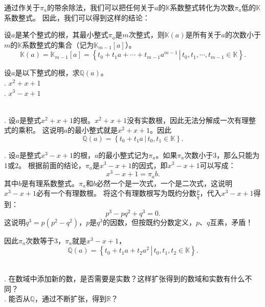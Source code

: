 \documentclass[12pt,UTF8]{ctexbook}
\begin{document}
通过作关于$\pi_a$的带余除法，我们可以把任何关于$a$的$\mathbb{K}$系数整式转化为次数$\pi_a$低的$\mathbb{K}$系数整式。
因此，我们可以得到这样的结论：

\begin{tm}
    设$a$是某个整式的根，其最小整式$\pi_a$是$m$次整式，则$\mathbb{K}(a)$是所有关于$a$的次数小于$m$的$\mathbb{K}$系数整式的集合（记为$\mathbb{K}_{m-1}[a]$）。
    $$\mathbb{K}(a) = \mathbb{K}_{m-1}[a] = \left\{\left.t_0 + t_1 a + \cdots + t_{m-1} a^{m-1} \, \right| \, t_0, t_1, \cdots , t_{m-1} \in \mathbb{K} \right\}.$$
\end{tm}

\begin{et}
    设$a$是以下整式的根，求$\mathbb{Q}(a)$。\\
    . $x^2 + x + 1 $\\
    . $x^3 - x + 1 $
\end{et}

\begin{so}
    \mbox{} \\
    . 设$a$是整式$x^2 + x + 1 $的根。$x^2 + x + 1 $没有实数根，因此无法分解成一次有理整式的乘积。
    这说明$a$的最小整式就是$x^2 + x + 1 $。因此
    $$\mathbb{Q}(a) = \left\{\left.t_0 + t_1 a \, \right| \, t_0, t_1 \in \mathbb{K} \right\}. $$
    
    . 设$a$是整式$x^3 - x + 1 $的根，$a$的最小整式记为$\pi_a$。如果$\pi_a$次数小于$3$，那么只能为$1$或$2$。
    根据前面的结论，$\pi_a$是$x^3 - x + 1 $的因式，即$x^3 - x + 1 $可以写成：
    $$x^3 - x + 1 = \pi_a b. $$
    其中$b$是有理系数整式。$\pi_a$和$b$必然一个是一次式，一个是二次式，这说明$x^3 - x + 1 $必有一个有理数根。
    将这个有理数根写为既约分数$\displaystyle \frac{p}{q}$，代入$x^3 - x + 1 $得到：
    $$ p^3 - pq^2 + q^3 = 0.$$
    这说明$q^3 = p(p^2 - q^2)$，$p$是$q^3$的因数，但按既约分数定义，$p$、$q$互素，矛盾！

    因此$\pi_a$次数等于$3$，$\pi_a$就是$x^3 - x + 1 $，
    $$\mathbb{Q}(a) = \left\{\left.t_0 + t_1 a + t_2 a^2 \, \right| \, t_0, t_1, t_2 \in \mathbb{K} \right\}. $$
\end{so}

\begin{sk}
    \mbox{} \\
    . 在数域中添加新的数，是否需要是实数？这样扩张得到的数域和实数有什么不同？\\
    . 能否从$\mathbb{Q}$，通过不断扩张，得到$\mathbb{R}$？
\end{sk}
\end{document}
